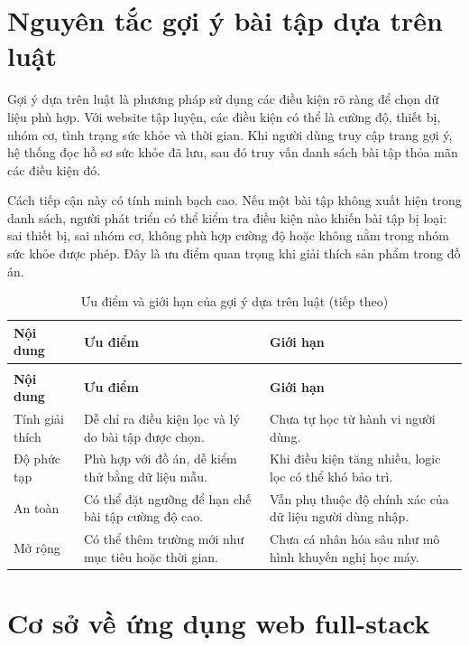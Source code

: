 \section{Nguyên tắc gợi ý bài tập dựa trên luật}

Gợi ý dựa trên luật là phương pháp sử dụng các điều kiện rõ ràng để chọn dữ liệu phù hợp. Với website tập luyện, các điều kiện có thể là cường độ, thiết bị, nhóm cơ, tình trạng sức khỏe và thời gian. Khi người dùng truy cập trang gợi ý, hệ thống đọc hồ sơ sức khỏe đã lưu, sau đó truy vấn danh sách bài tập thỏa mãn các điều kiện đó.


Cách tiếp cận này có tính minh bạch cao. Nếu một bài tập không xuất hiện trong danh sách, người phát triển có thể kiểm tra điều kiện nào khiến bài tập bị loại: sai thiết bị, sai nhóm cơ, không phù hợp cường độ hoặc không nằm trong nhóm sức khỏe được phép. Đây là ưu điểm quan trọng khi giải thích sản phẩm trong đồ án.


\begingroup
\setlength{\tabcolsep}{3pt}
\renewcommand{\arraystretch}{1.25}
\begin{longtable}{|P{0.220\textwidth}|P{0.330\textwidth}|P{0.370\textwidth}|}
\caption{Ưu điểm và giới hạn của gợi ý dựa trên luật}\\
\hline
\textbf{Nội dung} & \textbf{Ưu điểm} & \textbf{Giới hạn} \\
\hline
\endfirsthead
\caption[]{Ưu điểm và giới hạn của gợi ý dựa trên luật (tiếp theo)}\\
\hline
\textbf{Nội dung} & \textbf{Ưu điểm} & \textbf{Giới hạn} \\
\hline
\endhead
Tính giải thích & Dễ chỉ ra điều kiện lọc và lý do bài tập được chọn. & Chưa tự học từ hành vi người dùng. \\
\hline
Độ phức tạp & Phù hợp với đồ án, dễ kiểm thử bằng dữ liệu mẫu. & Khi điều kiện tăng nhiều, logic lọc có thể khó bảo trì. \\
\hline
An toàn & Có thể đặt ngưỡng để hạn chế bài tập cường độ cao. & Vẫn phụ thuộc độ chính xác của dữ liệu người dùng nhập. \\
\hline
Mở rộng & Có thể thêm trường mới như mục tiêu hoặc thời gian. & Chưa cá nhân hóa sâu như mô hình khuyến nghị học máy. \\
\hline
\end{longtable}
\endgroup

\section{Cơ sở về ứng dụng web full-stack}

